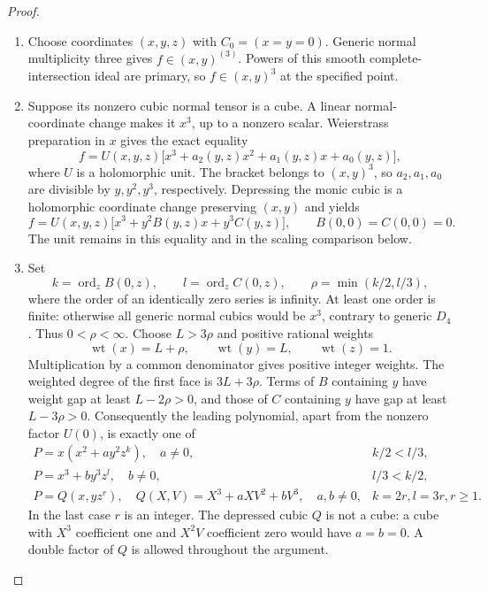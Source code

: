 \begin{proof}

\begin{enumerate}[label={$\langle1\rangle$\arabic*.},leftmargin=*]
\item Choose coordinates $(x,y,z)$ with $C_0=(x=y=0)$.
Generic normal multiplicity three gives
$f\in(x,y)^{(3)}$. Powers of this smooth
complete-intersection ideal are primary, so
$f\in(x,y)^3$ at the specified point.

\item Suppose its nonzero cubic normal tensor is a cube.
A linear normal-coordinate change makes it $x^3$, up
to a nonzero scalar. Weierstrass preparation in $x$
gives the exact equality
\[
 f=U(x,y,z)\bigl[x^3+a_2(y,z)x^2+a_1(y,z)x+a_0(y,z)\bigr],
\]
where $U$ is a holomorphic unit. The bracket belongs to
$(x,y)^3$, so $a_2,a_1,a_0$ are divisible by $y,y^2,y^3$,
respectively. Depressing the monic cubic is a holomorphic
coordinate change preserving $(x,y)$ and yields
\[
 f=U(x,y,z)\bigl[x^3+y^2B(y,z)x+y^3C(y,z)\bigr],
 \qquad B(0,0)=C(0,0)=0.                         \tag{R19.1}
\]
The unit remains in this equality and in the scaling
comparison below.

\item Set
\[
 k=\operatorname{ord}_z B(0,z),\qquad
 l=\operatorname{ord}_z C(0,z),\qquad
 \rho=\min(k/2,l/3),
\]
where the order of an identically zero series is infinity.
At least one order is finite: otherwise all generic normal
cubics would be $x^3$, contrary to generic $D_4$.
Thus $0<\rho<\infty$. Choose $L>3\rho$ and positive
rational weights
\[
       \operatorname{wt}(x)=L+\rho,\qquad
       \operatorname{wt}(y)=L,\qquad
       \operatorname{wt}(z)=1.
\]
Multiplication by a common denominator gives positive
integer weights. The weighted degree of the first face
is $3L+3\rho$. Terms of $B$ containing $y$ have weight
gap at least $L-2\rho>0$, and those of $C$ containing
$y$ have gap at least $L-3\rho>0$. Consequently the
leading polynomial, apart from the nonzero factor $U(0)$,
is exactly one of
\[
\begin{array}{ll}
 P=x(x^2+a y^2z^k),\quad a\ne0,
       & k/2<l/3,\\[2pt]
 P=x^3+b y^3z^l,\quad b\ne0,
       & l/3<k/2,\\[2pt]
 P=Q(x,yz^r),\quad
 Q(X,V)=X^3+aXV^2+bV^3,\quad a,b\ne0,
       & k=2r, l=3r, r\ge1.
\end{array}                                                   \tag{R19.2}
\]
In the last case $r$ is an integer. The depressed cubic
$Q$ is not a cube: a cube with $X^3$ coefficient one and
$X^2V$ coefficient zero would have $a=b=0$. A double
factor of $Q$ is allowed throughout the argument.


\end{enumerate}
\end{proof}
